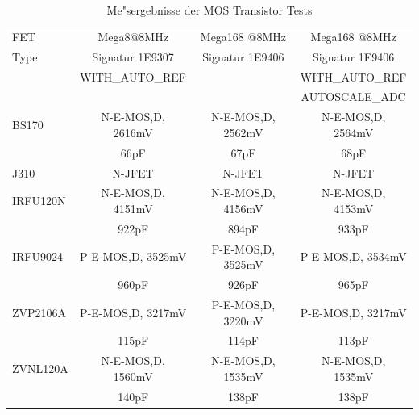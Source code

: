 \begin{table}[H]
  \begin{center}
    \begin{tabular}{| l | c | c | c |}
    \hline
     FET & Mega8@8MHz & Mega168 @8MHz & Mega168 @8MHz \\
    Type    & Signatur 1E9307 & Signatur 1E9406 & Signatur 1E9406 \\
           & WITH\_AUTO\_REF &  & WITH\_AUTO\_REF \\
           &                 &  & AUTOSCALE\_ADC \\
    \hline
    \hline
BS170 & N-E-MOS,D, 2616mV & N-E-MOS,D, 2562mV & N-E-MOS,D, 2564mV \\
      &  66pF             &  67pF  &  68pF \\
    \hline
J310 & N-JFET & N-JFET & N-JFET\\
    \hline
IRFU120N & N-E-MOS,D, 4151mV & N-E-MOS,D, 4156mV & N-E-MOS,D, 4153mV\\
     & 922pF  & 894pF  & 933pF \\
    \hline
IRFU9024 & P-E-MOS,D, 3525mV & P-E-MOS,D, 3525mV & P-E-MOS,D, 3534mV\\
     & 960pF & 926pF & 965pF \\
    \hline
ZVP2106A & P-E-MOS,D, 3217mV & P-E-MOS,D, 3220mV & P-E-MOS,D, 3217mV\\
  & 115pF & 114pF & 113pF \\
    \hline
ZVNL120A & N-E-MOS,D, 1560mV & N-E-MOS,D, 1535mV & N-E-MOS,D, 1535mV \\
  & 140pF & 138pF  & 138pF \\
    \hline
    \end{tabular}
  \end{center}
  \caption{Me"sergebnisse der MOS Transistor Tests}
  \label{tab:mos} 
\end{table}
